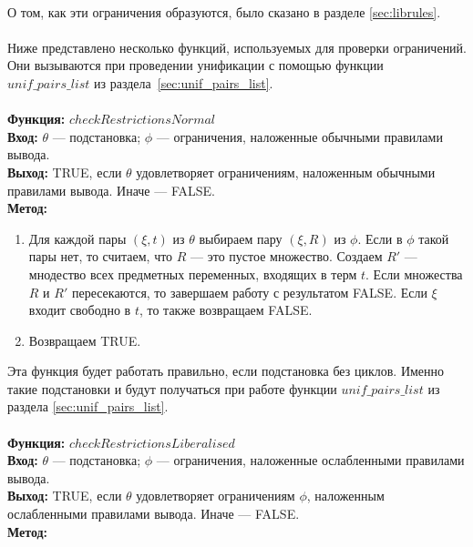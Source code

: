 \documentclass{cw1}
\begin{document}
\paragraph{}
О том, как эти ограничения образуются, было сказано в разделе \ref{sec:librules}.
\paragraph{}
Ниже представлено несколько функций, используемых для проверки ограничений. Они вызываются
при проведении унификации с помощью функции $unif\!\_pairs\_list$ из раздела~\ref{sec:unif_pairs_list}.
\\\qquad \\
\textbf{Функция: } $checkRestrictionsN\!ormal$\\
\textbf{Вход: } $\theta$ --- подстановка; $\phi$ --- ограничения, наложенные обычными правилами
вывода.\\
\textbf{Выход:} TRUE, если $\theta$ удовлетворяет ограничениям, наложенным обычными правилами вывода.
Иначе --- FALSE.\\
 \textbf{Метод:}
 \begin{enumerate}
  \item Для каждой пары $(\xi,t)$ из $\theta$ выбираем пару $(\xi,R)$ из $\phi$. Если в $\phi$ такой пары
  нет, то считаем, что $R$ --- это пустое множество.
  Создаем $R'$ --- мнодество всех предметных переменных, входящих в терм $t$. Если множества
  $R$ и $R'$ пересекаются, то завершаем работу с результатом FALSE. Если $\xi$ входит свободно в $t$,
  то также возвращаем FALSE.
  \item Возвращаем TRUE.
 \end{enumerate}
Эта функция будет работать правильно, если подстановка без циклов. Именно такие подстановки
и будут получаться при работе функции $unif\_pairs\_list$ из раздела \ref{sec:unif_pairs_list}.\\
 \qquad \\
\textbf{Функция: } $check\!RestrictionsLiberalised$\\
\textbf{Вход: } $\theta$ --- подстановка; $\phi$ --- ограничения, наложенные ослабленными правилами
вывода.\\
\textbf{Выход:} TRUE, если $\theta$ удовлетворяет ограничениям $\phi$, наложенным ослабленными
правилами вывода. Иначе --- FALSE.\\
\textbf{Метод:}
\end{document}
